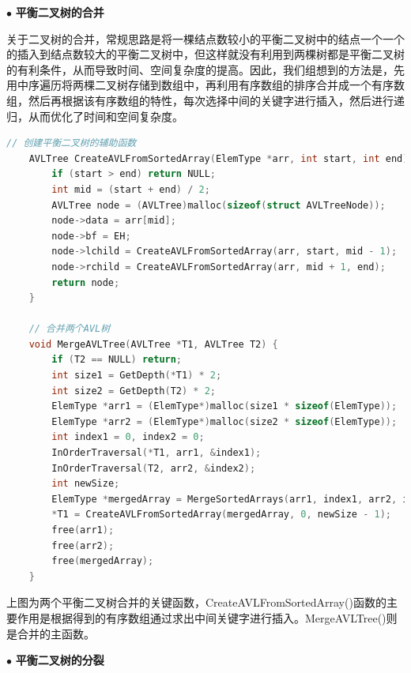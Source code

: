 \vspace{1ex}

\noindent
$\bullet$
\textbf{平衡二叉树的合并}

关于二叉树的合并，常规思路是将一棵结点数较小的平衡二叉树中的结点一个一个的插入到结点数较大的平衡二叉树中，但这样就没有利用到两棵树都是平衡二叉树的有利条件，从而导致时间、空间复杂度的提高。因此，我们组想到的方法是，先用中序遍历将两棵二叉树存储到数组中，再利用有序数组的排序合并成一个有序数组，然后再根据该有序数组的特性，每次选择中间的关键字进行插入，然后进行递归，从而优化了时间和空间复杂度。


\begin{lstlisting}[language=C, caption={平衡二叉树的合并}]
    // 创建平衡二叉树的辅助函数
    AVLTree CreateAVLFromSortedArray(ElemType *arr, int start, int end) {
        if (start > end) return NULL;
        int mid = (start + end) / 2;
        AVLTree node = (AVLTree)malloc(sizeof(struct AVLTreeNode));
        node->data = arr[mid];
        node->bf = EH;
        node->lchild = CreateAVLFromSortedArray(arr, start, mid - 1);
        node->rchild = CreateAVLFromSortedArray(arr, mid + 1, end);
        return node;
    }

    // 合并两个AVL树
    void MergeAVLTree(AVLTree *T1, AVLTree T2) {
        if (T2 == NULL) return;
        int size1 = GetDepth(*T1) * 2;
        int size2 = GetDepth(T2) * 2;
        ElemType *arr1 = (ElemType*)malloc(size1 * sizeof(ElemType));
        ElemType *arr2 = (ElemType*)malloc(size2 * sizeof(ElemType));
        int index1 = 0, index2 = 0;
        InOrderTraversal(*T1, arr1, &index1);
        InOrderTraversal(T2, arr2, &index2);
        int newSize;
        ElemType *mergedArray = MergeSortedArrays(arr1, index1, arr2, index2, &newSize);
        *T1 = CreateAVLFromSortedArray(mergedArray, 0, newSize - 1);
        free(arr1);
        free(arr2);
        free(mergedArray);
    }
\end{lstlisting}

上图为两个平衡二叉树合并的关键函数，CreateAVLFromSortedArray()函数的主要作用是根据得到的有序数组通过求出中间关键字进行插入。MergeAVLTree()则是合并的主函数。

\vspace{1ex}

\noindent
$\bullet$
\textbf{平衡二叉树的分裂}

